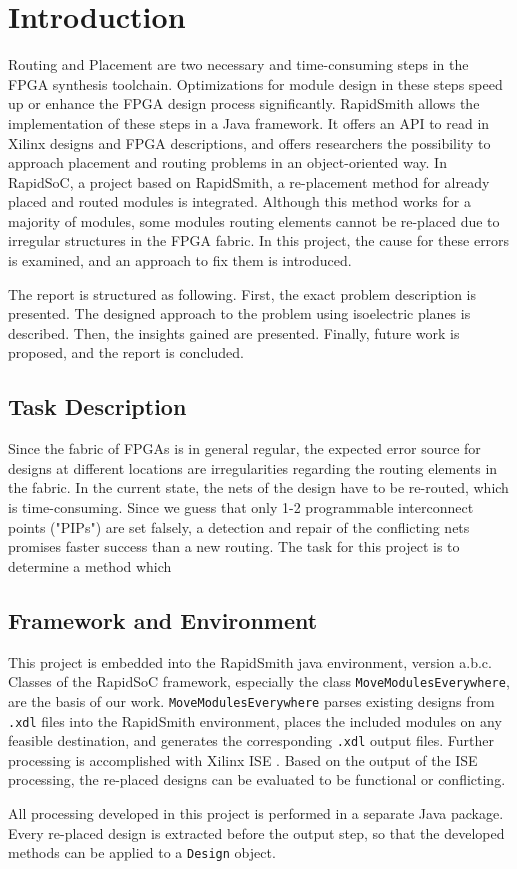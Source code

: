\chapter{Introduction}
\label{cha:introduction}

Routing and Placement are two necessary and time-consuming steps in the FPGA synthesis toolchain. Optimizations for module design in these steps speed up or enhance the FPGA design process significantly. RapidSmith \cite{lavin} allows the implementation of these steps in a Java framework. It offers an API to read in Xilinx designs and FPGA descriptions, and offers researchers the possibility to approach placement and routing problems in an object-oriented way. In RapidSoC, a project based on RapidSmith, a re-placement method for already placed and routed modules is integrated. Although this method works for a majority of modules, some modules routing elements cannot be re-placed due to irregular structures in the FPGA fabric. In this project, the cause for these errors is examined, and an approach to fix them is introduced.

The report is structured as following. First, the exact problem description is presented. The designed approach to the problem using isoelectric planes is described. Then, the insights gained are presented. Finally, future work is proposed, and the report is concluded.


\section{Task Description}
\label{sec:taskdescription}
Since the fabric of FPGAs is in general regular, the expected error source for designs at different locations are irregularities regarding the routing elements in the fabric. In the current state, the nets of the design have to be re-routed, which is time-consuming. Since we guess that only 1-2 programmable interconnect points ("PIPs") are set falsely, a detection and repair of the conflicting nets promises faster success than a new routing. The task for this project is to determine a method which 

\section{Framework and Environment}
\label{sec:frameworkandenvironment}

This project is embedded into the RapidSmith java environment, version a.b.c. Classes of the RapidSoC framework, especially the class \texttt{MoveModulesEverywhere}, are the basis of our work. \texttt{MoveModulesEverywhere} parses existing designs from \texttt{.xdl} files into the RapidSmith environment, places the included modules on any feasible destination, and generates the corresponding \texttt{.xdl} output files. Further processing is accomplished with Xilinx ISE \cite{ise}. Based on the output of the ISE processing, the re-placed designs can be evaluated to be functional or conflicting.

All processing developed in this project is performed in a separate Java package. Every re-placed design is extracted before the output step, so that the developed methods can be applied to a \texttt{Design} object.